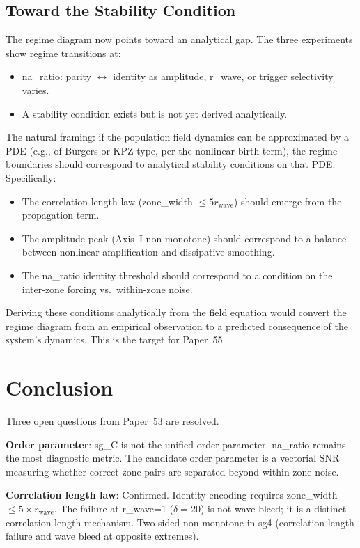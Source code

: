 \documentclass[11pt,a4paper]{article}
\begin{document}
\subsection{Toward the Stability Condition}

The regime diagram now points toward an analytical gap.
The three experiments show regime transitions at:
\begin{itemize}
  \item na\_ratio: parity $\leftrightarrow$ identity as amplitude, r\_wave, or
    trigger selectivity varies.
  \item A stability condition exists but is not yet derived analytically.
\end{itemize}

The natural framing: if the population field dynamics can be approximated by a
PDE (e.g., of Burgers or KPZ type, per the nonlinear birth term),
the regime boundaries should correspond to analytical stability conditions on
that PDE.
Specifically:
\begin{itemize}
  \item The correlation length law
    (zone\_width $\leq 5 r_\text{wave}$) should emerge from the propagation
    term.
  \item The amplitude peak (Axis~I non-monotone) should correspond to a
    balance between nonlinear amplification and dissipative smoothing.
  \item The na\_ratio identity threshold should correspond to a condition on
    the inter-zone forcing vs.\ within-zone noise.
\end{itemize}
Deriving these conditions analytically from the field equation would convert
the regime diagram from an empirical observation to a predicted consequence
of the system's dynamics.
This is the target for Paper~55.

\section{Conclusion}

Three open questions from Paper~53 are resolved.

\textbf{Order parameter}: sg\_C is not the unified order parameter.
na\_ratio remains the most diagnostic metric.
The candidate order parameter is a vectorial SNR measuring whether
correct zone pairs are separated beyond within-zone noise.

\textbf{Correlation length law}: Confirmed.
Identity encoding requires zone\_width $\leq 5 \times r_\text{wave}$.
The failure at r\_wave=1 ($\delta=20$) is not wave bleed; it is a distinct
correlation-length mechanism.
Two-sided non-monotone in sg4 (correlation-length failure and wave bleed
at opposite extremes).
\end{document}
